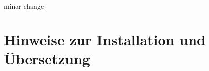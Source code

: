 minor change









\chapter{Hinweise zur Installation und \"Ubersetzung}



\newpage
\sePrintGlossary{}


\sePrintBibliography{}






\seEhrenwoertlicheErklaerung{}

